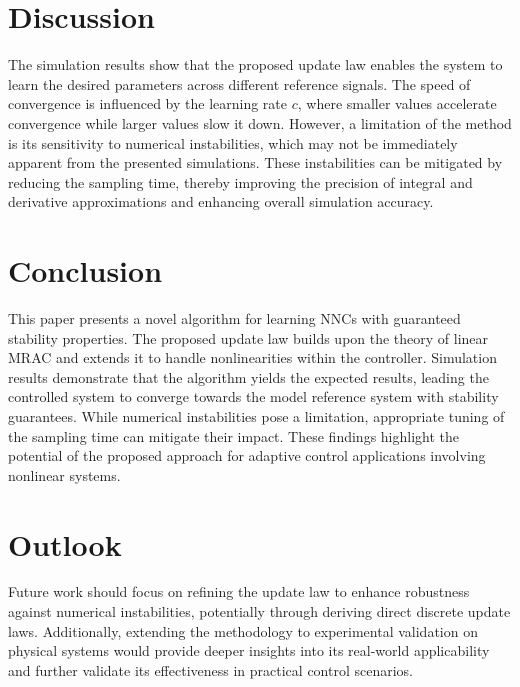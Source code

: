 \section{Discussion}
\label{sec:discussion}
The simulation results show that the proposed update law enables the system to learn the desired parameters across different reference signals. The speed of convergence is influenced by the learning rate $c$, where smaller values accelerate convergence while larger values slow it down. However, a limitation of the method is its sensitivity to numerical instabilities, which may not be immediately apparent from the presented simulations. These instabilities can be mitigated by reducing the sampling time, thereby improving the precision of integral and derivative approximations and enhancing overall simulation accuracy.

\section{Conclusion}
\label{sec:conclusion}
This paper presents a novel algorithm for learning NNCs with guaranteed stability properties. The proposed update law builds upon the theory of linear MRAC and extends it to handle nonlinearities within the controller. Simulation results demonstrate that the algorithm yields the expected results, leading the controlled system to converge towards the model reference system with stability guarantees. While numerical instabilities pose a limitation, appropriate tuning of the sampling time can mitigate their impact. These findings highlight the potential of the proposed approach for adaptive control applications involving nonlinear systems.

\section{Outlook}
\label{sec:outlook}
Future work should focus on refining the update law to enhance robustness against numerical instabilities, potentially through deriving direct discrete update laws. Additionally, extending the methodology to experimental validation on physical systems would provide deeper insights into its real-world applicability and further validate its effectiveness in practical control scenarios.